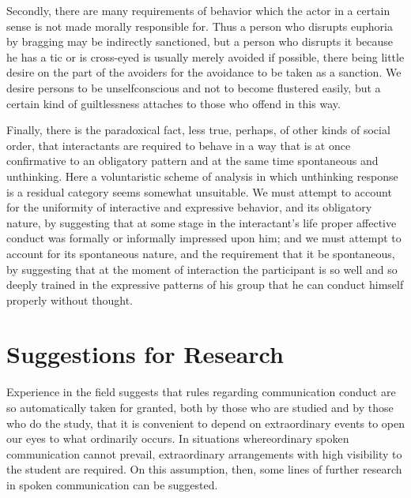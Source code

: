 \documentclass[twoside,symmetric,nobib,justified]{tufte-book}
\begin{document}
Secondly, there are many requirements of behavior which the actor in a
certain sense is not made morally responsible for. Thus a person who
disrupts euphoria by bragging may be indirectly sanctioned, but a person
who disrupts it because he has a tic or is cross-eyed is usually merely
avoided if possible, there being little desire on the part of the
avoiders for the avoidance to be taken as a sanction. We desire persons
to be unselfconscious and not to become flustered easily, but a certain
kind of guiltlessness attaches to those who offend in this way.

Finally, there is the paradoxical fact, less true, perhaps, of other
kinds of social order, that interactants are required to behave in a way
that is at once confirmative to an obligatory pattern and at the same
time spontaneous and unthinking. Here a voluntaristic scheme of analysis
in which unthinking response is a residual category seems somewhat
unsuitable. We must attempt to account for the uniformity of interactive
and expressive behavior, and its obligatory nature, by suggesting that
at some stage in the interactant's life proper affective conduct was
formally or informally impressed upon him; and we must attempt to
account for its spontaneous nature, and the requirement that it be
spontaneous, by suggesting that at the moment of interaction the
participant is so well and so deeply trained in the expressive patterns
of his group that he can conduct himself properly without thought.

\hypertarget{suggestions-for-research}{%
\section{Suggestions for Research}\label{suggestions-for-research}}

Experience in the field suggests that rules regarding communication
conduct are so automatically taken for granted, both by those who are
studied and by those who do the study, that it is convenient to depend
on extraordinary events to open our eyes to what ordinarily occurs. In
situations where\newpage\noindent ordinary spoken communication cannot prevail,
extraordinary arrangements with high visibility to the student are
required. On this assumption, then, some lines of further research in
spoken communication can be suggested.
\end{document}
